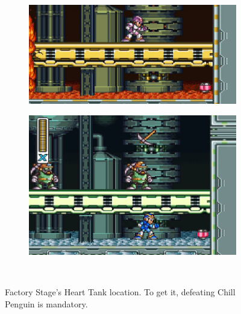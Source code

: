 \begin{figure}[h]
	\centering
	\begin{subfigure}{0.49\textwidth}
		\centering
		\includegraphics[width=\linewidth]{figures/X1/Flame_mammoth/Flame_heart_1.jpg}
		\caption{}
	\end{subfigure}
	\begin{subfigure}{0.4\textwidth}
		\centering
		\includegraphics[width=\linewidth]{figures/X1/Flame_mammoth/Flame_heart_2.jpg}
		\caption{}
	\end{subfigure}\\
	\caption{Factory Stage's Heart Tank location. To get it, defeating Chill Penguin is mandatory.}
\end{figure}

